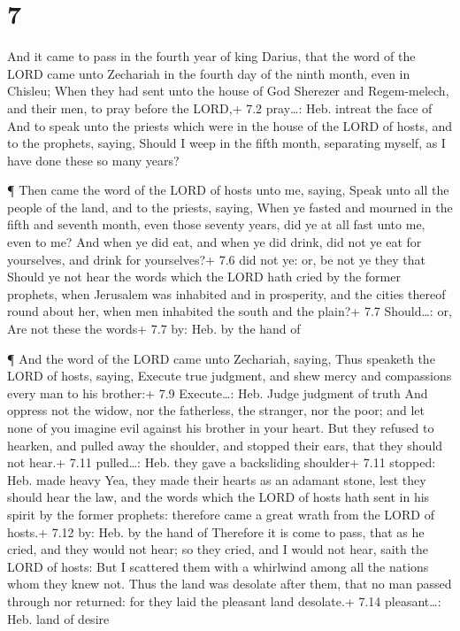 \hypertarget{section-6}{%
\section{7}\label{section-6}}

 And it came to pass in the fourth year of king Darius, that
the word of the LORD came unto Zechariah in the fourth day of the ninth
month, even in Chisleu;  When they had sent unto the house
of God Sherezer and Regem-melech, and their men, to pray before the
LORD,+ 7.2 pray\ldots: Heb. intreat the face of  And to
speak unto the priests which were in the house of the LORD of hosts, and
to the prophets, saying, Should I weep in the fifth month, separating
myself, as I have done these so many years?

 ¶ Then came the word of the LORD of hosts unto me, saying,
 Speak unto all the people of the land, and to the priests,
saying, When ye fasted and mourned in the fifth and seventh month, even
those seventy years, did ye at all fast unto me, even to me?
 And when ye did eat, and when ye did drink, did not ye eat
for yourselves, and drink for yourselves?+ 7.6 did not ye: or, be not ye
they that  Should ye not hear the words which the LORD hath
cried by the former prophets, when Jerusalem was inhabited and in
prosperity, and the cities thereof round about her, when men inhabited
the south and the plain?+ 7.7 Should\ldots: or, Are not these the words+
7.7 by: Heb. by the hand of

 ¶ And the word of the LORD came unto Zechariah, saying,
 Thus speaketh the LORD of hosts, saying, Execute true
judgment, and shew mercy and compassions every man to his brother:+ 7.9
Execute\ldots: Heb. Judge judgment of truth  And oppress
not the widow, nor the fatherless, the stranger, nor the poor; and let
none of you imagine evil against his brother in your heart.
 But they refused to hearken, and pulled away the shoulder,
and stopped their ears, that they should not hear.+ 7.11 pulled\ldots:
Heb. they gave a backsliding shoulder+ 7.11 stopped: Heb. made heavy
 Yea, they made their hearts as an adamant stone, lest they
should hear the law, and the words which the LORD of hosts hath sent in
his spirit by the former prophets: therefore came a great wrath from the
LORD of hosts.+ 7.12 by: Heb. by the hand of  Therefore it
is come to pass, that as he cried, and they would not hear; so they
cried, and I would not hear, saith the LORD of hosts:  But
I scattered them with a whirlwind among all the nations whom they knew
not. Thus the land was desolate after them, that no man passed through
nor returned: for they laid the pleasant land desolate.+ 7.14
pleasant\ldots: Heb. land of desire

